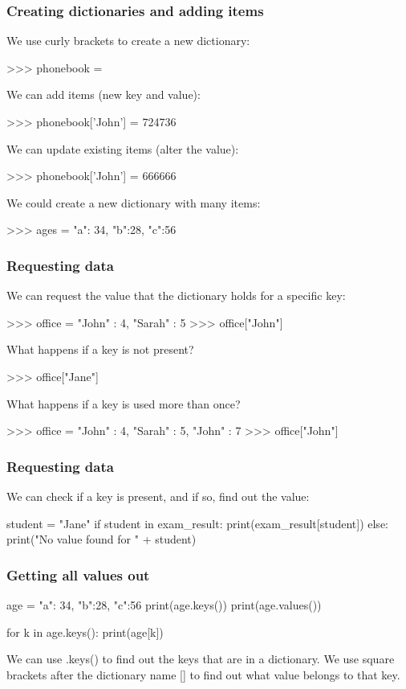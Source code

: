 \documentclass{beamer}
\begin{document}
\begin{frame}[fragile]
\frametitle{Creating dictionaries and adding items}
We use curly brackets to create a new dictionary:
\begin{code}
>>> phonebook = {}
\end{code}
We can add items (new key and value):
\begin{code}
>>> phonebook['John'] = 724736
\end{code}
We can update existing items (alter the value):
\begin{code}
>>> phonebook['John'] = 666666
\end{code}
We could create a new dictionary with many items:
\begin{code}
>>> ages = { "a": 34, "b":28, "c":56 }
\end{code}
\end{frame}

\begin{frame}[fragile]
\frametitle{Requesting data}
We can request the value that the dictionary holds for a specific
key:
\begin{code}
>>> office = { "John" : 4, "Sarah" : 5 }
>>> office["John"]
\end{code}
 What happens if a key is not present?
\begin{code}
>>> office["Jane"]
\end{code}
 What happens if a key is used more than once?
\begin{code}
>>> office = { "John" : 4, "Sarah" : 5, "John" : 7 }
>>> office["John"]
\end{code}
\end{frame}


\begin{frame}[fragile]
\frametitle{Requesting data}
We can check if a key is present, and if so, find out the
value:
\begin{code}
student = "Jane"
if student in exam_result:
   print(exam_result[student])
else:
   print("No value found for " + student)
\end{code}
\end{frame}



\begin{frame}[fragile]
\frametitle{Getting all values out}
\begin{code}
age = { "a": 34, "b":28, "c":56 }
print(age.keys())
print(age.values())

for k in age.keys():
   print(age[k])
\end{code}
We can use .keys() to find out the keys that are in a dictionary.
We use square brackets after the dictionary name [] to find
out what value belongs to that key.
\end{frame}
\end{document}
